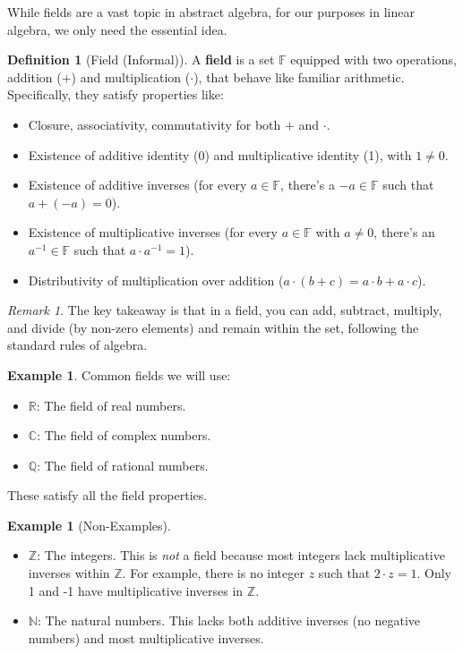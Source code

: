 \documentclass[11pt]{article}
\theoremstyle{definition}
\newtheorem{definition}[theorem]{Definition}
\newtheorem{example}[theorem]{Example}
\theoremstyle{remark}
\newtheorem{remark}[theorem]{Remark}
\newcommand{\field}[1]{\mathbb{#1}} %
\newcommand{\R}{\field{R}}
\newcommand{\C}{\field{C}}
\newcommand{\Q}{\field{Q}}
\newcommand{\F}{\field{F}} %
\newcommand{\Z}{\field{Z}} %
\newcommand{\N}{\field{N}} %
\begin{document}
While fields are a vast topic in abstract algebra, for our purposes in linear algebra, we only need the essential idea.

\begin{definition}[Field (Informal)]
A \textbf{field} is a set $\F$ equipped with two operations, addition ($+$) and multiplication ($\cdot$), that behave like familiar arithmetic. Specifically, they satisfy properties like:
\begin{itemize}
    \item Closure, associativity, commutativity for both $+$ and $\cdot$.
    \item Existence of additive identity (0) and multiplicative identity (1), with $1 \neq 0$.
    \item Existence of additive inverses (for every $a \in \F$, there's a $-a \in \F$ such that $a+(-a)=0$).
    \item Existence of multiplicative inverses (for every $a \in \F$ with $a \neq 0$, there's an $a^{-1} \in \F$ such that $a \cdot a^{-1}=1$).
    \item Distributivity of multiplication over addition ($a \cdot (b+c) = a \cdot b + a \cdot c$).
\end{itemize}
\end{definition}

\begin{remark}
The key takeaway is that in a field, you can add, subtract, multiply, and divide (by non-zero elements) and remain within the set, following the standard rules of algebra.
\end{remark}

\begin{example}
Common fields we will use:
\begin{itemize}
    \item $\R$: The field of real numbers.
    \item $\C$: The field of complex numbers.
    \item $\Q$: The field of rational numbers.
\end{itemize}
These satisfy all the field properties.
\end{example}

\begin{example}[Non-Examples]
\begin{itemize}
    \item $\Z$: The integers. This is \emph{not} a field because most integers lack multiplicative inverses within $\Z$. For example, there is no integer $z$ such that $2 \cdot z = 1$. Only 1 and -1 have multiplicative inverses in $\Z$.
    \item $\N$: The natural numbers. This lacks both additive inverses (no negative numbers) and most multiplicative inverses.
\end{itemize}
\end{example}
\end{document}
